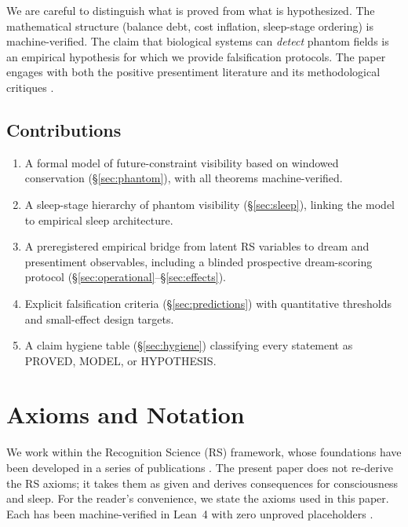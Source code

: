 \documentclass[11pt, a4paper]{article}
\theoremstyle{definition}
\theoremstyle{remark}
\begin{document}
We are careful to distinguish what is proved from what is hypothesized.
The mathematical structure (balance debt, cost inflation, sleep-stage
ordering) is machine-verified. The claim that biological systems can
\emph{detect} phantom fields is an empirical hypothesis for which
we provide falsification protocols. The paper engages with both the
positive presentiment literature \cite{Radin2004,Mossbridge2012} and
its methodological critiques \cite{Wagenmakers2012,Alcock2003}.

\subsection{Contributions}

\begin{enumerate}
    \item A formal model of future-constraint visibility based on
    windowed conservation (\S\ref{sec:phantom}), with all theorems
    machine-verified.
    \item A sleep-stage hierarchy of phantom visibility
    (\S\ref{sec:sleep}), linking the model to empirical sleep
    architecture.
    \item A preregistered empirical bridge from latent RS variables
    to dream and presentiment observables, including a blinded
    prospective dream-scoring protocol
    (\S\ref{sec:operational}--\S\ref{sec:effects}).
    \item Explicit falsification criteria (\S\ref{sec:predictions})
    with quantitative thresholds and small-effect design targets.
    \item A claim hygiene table (\S\ref{sec:hygiene}) classifying
    every statement as PROVED, MODEL, or HYPOTHESIS.
\end{enumerate}


\section{Axioms and Notation}\label{sec:axioms}

We work within the Recognition Science (RS) framework, whose
foundations have been developed in a series of publications
\cite{RSAxioms2025,RSCost2025,RSGeometry2025,RSdalembert2026,
RSFermionMasses2025}. The present paper does not re-derive the RS
axioms; it takes them as given and derives consequences for
consciousness and sleep. For the reader's convenience, we state
the axioms used in this paper. Each has been machine-verified in
Lean~4 with zero unproved placeholders \cite{RSLeanRepo}.
\end{document}
